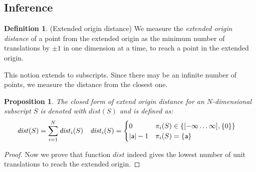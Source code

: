 \documentclass[acmlarge,review]{acmart}
\theoremstyle{definition}
\newtheorem{defn}{Definition}
\theoremstyle{plain}
\newtheorem{prop}{Proposition}
\theoremstyle{remark}
\begin{document}

\subsection{Inference}

\begin{defn}{(Extended origin distance)}
  We measure the \emph{extended origin distance} of a point from the extended
  origin as the minimum number of translations by $\pm 1$ in one dimension at a
  time, to reach a point in the extended origin.

  This notion extends to subscripts. Since there may be an infinite number of
  points, we measure the distance from the closest one.
\end{defn}
%
\begin{prop}{}
  The closed form of extend origin distance for an $N$-dimensional subscript $S$
  is denoted with $\mathit{dist}(S)$ and is defined as:
%
  \begin{align*}
    \mathit{dist}(S) & = \sum_{i=1}^{N} \mathit{dist}_i(S)
    &
    \mathit{dist}_i(S) & = \begin{cases}
      0 & \pi_i(S) \in \{ \textnormal{$\lbrack-\infty\dots\infty\rbrack^{}$}, \{ 0 \}\} \\
      |\mathsf{a}| - 1 & \pi_i(S) = \{\mathsf{a}\} \\
    \end{cases}
  \end{align*}
\end{prop}
%
\begin{proof}
  Now we prove that function $\mathit{dist}$ indeed gives the lowest number of
  unit translations to reach the extended origin.
\end{proof}
\end{document}
